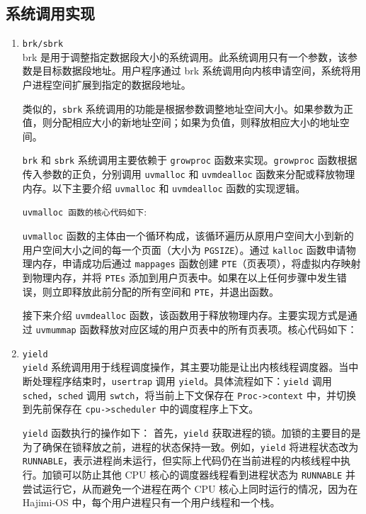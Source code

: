 \documentclass[UTF8]{article}
\begin{document}
\subsection{系统调用实现}
\begin{enumerate}
  \item \texttt{brk/sbrk\\} brk 是用于调整指定数据段大小的系统调用。此系统调用只有一个参数，该参数是目标数据段地址。用户程序通过 brk 系统调用向内核申请空间，系统将用户进程空间扩展到指定的数据段地址。

        类似的，\texttt{sbrk} 系统调用的功能是根据参数调整地址空间大小。如果参数为正值，则分配相应大小的新地址空间；如果为负值，则释放相应大小的地址空间。

        \texttt{brk} 和 \texttt{sbrk} 系统调用主要依赖于 \texttt{growproc} 函数来实现。\texttt{growproc} 函数根据传入参数的正负，分别调用 \texttt{uvmalloc} 和 \texttt{uvmdealloc} 函数来分配或释放物理内存。以下主要介绍 \texttt{uvmalloc} 和 \texttt{uvmdealloc} 函数的实现逻辑。

        \texttt{uvmalloc 函数的核心代码如下}:
        
        \texttt{uvmalloc} 函数的主体由一个循环构成，该循环遍历从原用户空间大小到新的用户空间大小之间的每一个页面（大小为 \texttt{PGSIZE}）。通过 \texttt{kalloc} 函数申请物理内存，申请成功后通过 \texttt{mappages} 函数创建 \texttt{PTE}（页表项），将虚拟内存映射到物理内存，并将 \texttt{PTEs} 添加到用户页表中。如果在以上任何步骤中发生错误，则立即释放此前分配的所有空间和 \texttt{PTE}，并退出函数。

        接下来介绍 \texttt{uvmdealloc} 函数，该函数用于释放物理内存。主要实现方式是通过 \texttt{uvmummap} 函数释放对应区域的用户页表中的所有页表项。核心代码如下：
        

  \item \texttt{yield\\} \texttt{yield} 系统调用用于线程调度操作，其主要功能是让出内核线程调度器。当中断处理程序结束时，\texttt{usertrap} 调用 \texttt{yield}。具体流程如下：\texttt{yield} 调用 \texttt{sched}，\texttt{sched} 调用 \texttt{swtch}，将当前上下文保存在 \texttt{Proc->context} 中，并切换到先前保存在 \texttt{cpu->scheduler} 中的调度程序上下文。

        \texttt{yield} 函数执行的操作如下：
        首先，\texttt{yield} 获取进程的锁。加锁的主要目的是为了确保在锁释放之前，进程的状态保持一致。例如，\texttt{yield} 将进程状态改为 \texttt{RUNNABLE}，表示进程尚未运行，但实际上代码仍在当前进程的内核线程中执行。加锁可以防止其他 CPU 核心的调度器线程看到进程状态为 \texttt{RUNNABLE} 并尝试运行它，从而避免一个进程在两个 CPU 核心上同时运行的情况，因为在 Hajimi-OS 中，每个用户进程只有一个用户线程和一个栈。


\end{enumerate}
\end{document}
